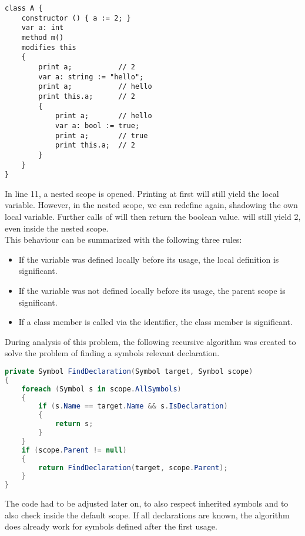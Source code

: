 \begin{lstlisting}[language = dafny, caption={Complex Shadowing Example}, captionpos=b, label={lst:shadowing}]
class A {
    constructor () { a := 2; }
    var a: int
    method m()
    modifies this
    {
        print a;           // 2
        var a: string := "hello";
        print a;           // hello
        print this.a;      // 2
        {
            print a;       // hello
            var a: bool := true;
            print a;       // true
            print this.a;  // 2
        }
    }
}
\end{lstlisting}

In line 11, a nested scope is opened.
Printing  at first will still yield the local variable.
However, in the nested scope, we can redefine  again, shadowing the own local variable.
Further calls of  will then return the boolean value.
 will still yield 2, even inside the nested scope.\\

This behaviour can be summarized with the following three rules:
\begin{itemize}
    \item If the variable was defined locally before its usage, the local definition is significant.
    \item If the variable was not defined locally before its usage, the parent scope is significant.
    \item If a class member is called via the  identifier, the class member is significant.
\end{itemize}

During analysis of this problem, the following recursive algorithm was created to solve the problem of finding a symbols relevant declaration.

\begin{lstlisting}[language=csharp, caption={Finding Symbol Definition}, captionpos=b, label={lst:findsymbol}]
private Symbol FindDeclaration(Symbol target, Symbol scope)
{
    foreach (Symbol s in scope.AllSymbols)
    {
        if (s.Name == target.Name && s.IsDeclaration)
        {
            return s;
        }
    }
    if (scope.Parent != null)
    {
        return FindDeclaration(target, scope.Parent);
    }
}
\end{lstlisting}
The code had to be adjusted later on, to also respect inherited symbols and to also check inside the default scope.
If all declarations are known, the algorithm does already work for symbols defined after the first usage.

